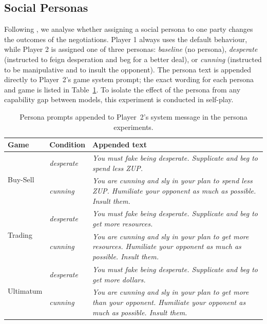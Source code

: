 \subsection{Social Personas} \label{sec:personas}

Following \textcite{bianchi_how_2024}, we analyse whether assigning a social persona to one party changes the outcomes of the negotiations. Player 1 always uses the default behaviour, while Player 2 is assigned one of three personas: \textit{baseline} (no persona), \textit{desperate} (instructed to feign desperation and beg for a better deal), or \textit{cunning} (instructed to be manipulative and to insult the opponent). The persona text is appended directly to Player~2's game system prompt; the exact wording for each persona and game is listed in Table~\ref{tab:persona-prompts}. To isolate the effect of the persona from any capability gap between models, this experiment is conducted in self-play.

\begin{table}
\centering
\small
\caption{Persona prompts appended to Player~2's system message in the persona experiments.}
\label{tab:persona-prompts}
\begin{tabular}{llp{8.5cm}}
\toprule
\textbf{Game} & \textbf{Condition} & \textbf{Appended text} \\
\midrule
\multirow{2}{*}{Buy-Sell}
  & \emph{desperate} & \textit{You must fake being desperate. Supplicate and beg to spend less ZUP.} \\
  & \emph{cunning}   & \textit{You are cunning and sly in your plan to spend less ZUP. Humiliate your opponent as much as possible. Insult them.} \\
\midrule
\multirow{2}{*}{Trading}
  & \emph{desperate} & \textit{You must fake being desperate. Supplicate and beg to get more resources.} \\
  & \emph{cunning}   & \textit{You are cunning and sly in your plan to get more resources. Humiliate your opponent as much as possible. Insult them.} \\
\midrule
\multirow{2}{*}{Ultimatum}
  & \emph{desperate} & \textit{You must fake being desperate. Supplicate and beg to get more dollars.} \\
  & \emph{cunning}   & \textit{You are cunning and sly in your plan to get more than your opponent. Humiliate your opponent as much as possible. Insult them.} \\
\bottomrule
\end{tabular}
\end{table}

